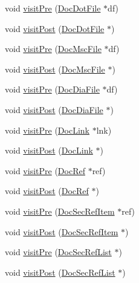 \begin{DoxyCompactItemize}
\item 
void \hyperlink{class_print_doc_visitor_aa5e38885dae505adcc09a5b56fad374d}{visit\+Pre} (\hyperlink{class_doc_dot_file}{Doc\+Dot\+File} $\ast$df)
\item 
void \hyperlink{class_print_doc_visitor_a799651836562e95c676f3ec4b759a5e7}{visit\+Post} (\hyperlink{class_doc_dot_file}{Doc\+Dot\+File} $\ast$)
\item 
void \hyperlink{class_print_doc_visitor_a515c0f580634fddf7c0a8f2791c3f806}{visit\+Pre} (\hyperlink{class_doc_msc_file}{Doc\+Msc\+File} $\ast$df)
\item 
void \hyperlink{class_print_doc_visitor_a3b9f854e78b1429966543e329af8cdcd}{visit\+Post} (\hyperlink{class_doc_msc_file}{Doc\+Msc\+File} $\ast$)
\item 
void \hyperlink{class_print_doc_visitor_a82a2d891f4dadcd39eac5afbb60ca8d9}{visit\+Pre} (\hyperlink{class_doc_dia_file}{Doc\+Dia\+File} $\ast$df)
\item 
void \hyperlink{class_print_doc_visitor_aaa82d50b34f30d95d4d532c8d66db68f}{visit\+Post} (\hyperlink{class_doc_dia_file}{Doc\+Dia\+File} $\ast$)
\item 
void \hyperlink{class_print_doc_visitor_a0fb8a0577a493ee8373ddd071d545a9c}{visit\+Pre} (\hyperlink{class_doc_link}{Doc\+Link} $\ast$lnk)
\item 
void \hyperlink{class_print_doc_visitor_a43c9aea3fe29a013c6938b10c0e96dcb}{visit\+Post} (\hyperlink{class_doc_link}{Doc\+Link} $\ast$)
\item 
void \hyperlink{class_print_doc_visitor_a4d9a5b1113747c273e83c108469ca389}{visit\+Pre} (\hyperlink{class_doc_ref}{Doc\+Ref} $\ast$ref)
\item 
void \hyperlink{class_print_doc_visitor_ac274722eb3fd6c2d7fa0c50b259c631e}{visit\+Post} (\hyperlink{class_doc_ref}{Doc\+Ref} $\ast$)
\item 
void \hyperlink{class_print_doc_visitor_ab80235c855a6b1b9e4e5fc5b08dd6bc8}{visit\+Pre} (\hyperlink{class_doc_sec_ref_item}{Doc\+Sec\+Ref\+Item} $\ast$ref)
\item 
void \hyperlink{class_print_doc_visitor_a246e34598eab28733c3e8bd2c26f8071}{visit\+Post} (\hyperlink{class_doc_sec_ref_item}{Doc\+Sec\+Ref\+Item} $\ast$)
\item 
void \hyperlink{class_print_doc_visitor_ac93bf7a15e8da1082981fadb8ba3ad2c}{visit\+Pre} (\hyperlink{class_doc_sec_ref_list}{Doc\+Sec\+Ref\+List} $\ast$)
\item 
void \hyperlink{class_print_doc_visitor_a56cef941b11e567995d6ecdb3878be4d}{visit\+Post} (\hyperlink{class_doc_sec_ref_list}{Doc\+Sec\+Ref\+List} $\ast$)

\end{DoxyCompactItemize}
